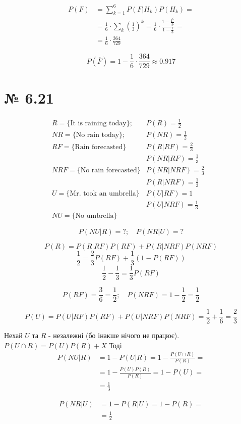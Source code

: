 \documentclass[11pt, a4paper]{article} %
\begin{document}
\begin{align*}
    P(F) &= \sum_{k=1}^6 P(F|H_k)P(H_k) = \\
    &= \frac{1}{6}\cdot \sum_k \left(\frac{1}{3}\right)^k = \frac{1}{6}\cdot \frac{1-\frac{1^6}{3^6}}{1-\frac{1}{3}} = \\
    &= \frac{1}{6} \cdot \frac{364}{729}
\end{align*}

\begin{mdframed}[style=ans]
    $$P(\overline{F}) = 1-\frac{1}{6} \cdot \frac{364}{729} \approx 0.917$$
\end{mdframed}

\section*{№ 6.21}
\begin{align*}
    & R = \{\text{It is raining today}\}; & P(R) = \frac{1}{2} && \\
    & NR = \{\text{No rain today}\}; & P(NR) = \frac{1}{2} && \\
    & RF = \{\text{Rain forecasted}\} & P(R|RF) = \frac{2}{3} && \\
    & & P(NR|RF) = \frac{1}{3} &&\\
    & NRF = \{\text{No rain forecasted}\}& P(NR|NRF) = \frac{2}{3} &&\\
    & & P(R|NRF) = \frac{1}{3} &&\\
    & U = \{\text{Mr. took an umbrella}\} & P(U|RF) = 1 &&\\
    & & P(U|NRF) = \frac{1}{3} && \\
    & NU = \{\text{No umbrella}\} & &&
\end{align*}

$$P(NU|R) = ?;\quad P(NR|U) = ?$$

\begin{mdframed}
    $$P(R) = P(R|RF)P(RF) + P(R|NRF)P(NRF)$$
    $$\frac{1}{2} = \frac{2}{3} P(RF) + \frac{1}{3}(1-P(RF))$$
    $$\frac{1}{2} - \frac{1}{3} = \frac{1}{3} P(RF)$$

    $$P(RF) = \frac{3}{6} = \frac{1}{2};\quad P(NRF) = 1-\frac{1}{2} = \frac{1}{2}$$
\end{mdframed}

$$P(U) = P(U|RF)P(RF) + P(U|NRF)P(NRF) = \frac{1}{2} + \frac{1}{6} = \frac{2}{3}$$

Нехай $U$ та $R$ - незалежні (бо інакше нічого не працює).
$P(U\cap R) = P(U)P(R) + X$
Тоді 
\begin{align*}
    P(NU|R) &= 1-P(U|R) = 1-\frac{P(U\cap R)}{P(R)} =\\
    &= 1-\frac{P(U)P(R)}{P(R)} = 1-P(U) = \\ &= \frac{1}{3}
\end{align*}

\begin{align*}
    P(NR|U) &= 1-P(R|U) = 1-P(R) =\\ &= \frac{1}{2}
\end{align*}
\end{document}
